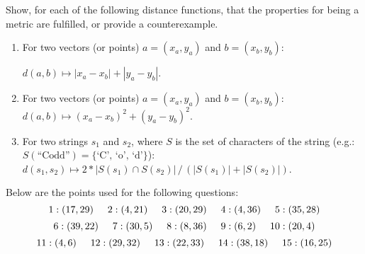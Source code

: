 
Show, for each of the following distance functions, that the properties for being a metric are fulfilled, or provide a counterexample.

    \begin{enumerate}

   \item\label{l1} 
   For two vectors (or points) $a=(x_a, y_a)$ and $b=(x_b, y_b)$:

 $d(a, b) \mapsto | x_a - x_b | + | y_a - y_b |$.  

  \item\label{l2} 
For two vectors (or points) $a=(x_a, y_a)$ and $b=(x_b, y_b)$:
 $d(a, b) \mapsto ( x_a - x_b )^2 + ( y_a - y_b )^2$.

      \item\label{l3} 
      For two strings $s_1$ and $s_2$, where $S$ is the set of characters of the string (e.g.: $S(\text{``Codd''}) = \{\text{`C', `o', `d'}\}$):
      $d(s_1, s_2) \mapsto 2* |S(s_1) \cap S(s_2)| \, / \, (|S(s_1)| + |S(s_2)|)$.\\

    \end{enumerate}

\newpage
{}

  Below are the points used for the following questions:
\[
1: (17, 29) \hspace{5mm}
2: (4, 21) \hspace{5mm}
3: (20, 29) \hspace{5mm}
4: (4, 36) \hspace{5mm}
5: (35, 28)
\]
\[
6: (39, 22) \hspace{5mm}
7: (30, 5) \hspace{5mm}
8: (8, 36) \hspace{5mm}
9: (6, 2) \hspace{5mm}
10: (20, 4)
\]
\[
11: (4, 6) \hspace{5mm}
12: (29, 32) \hspace{5mm}
13: (22, 33) \hspace{5mm}
14: (38, 18) \hspace{5mm}
15: (16, 25)
\]

